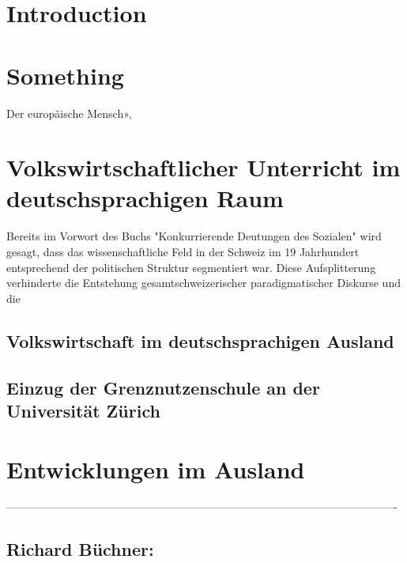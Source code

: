 \documentclass[12pt,a4paper,bibliography=totocnumbered,listof=totocnumbered]{scrartcl}
\begin{document}

\section{Introduction}
\newpage


\section{Something}
Der europäische Mensch», 


\section{Volkswirtschaftlicher Unterricht im deutschsprachigen Raum}

Bereits im Vorwort des Buchs "Konkurrierende Deutungen des Sozialen" wird gesagt, dass das wissenschaftliche Feld in der Schweiz im 19 Jahrhundert entsprechend der politischen Struktur segmentiert war. Diese Aufsplitterung verhinderte die Entstehung gesamtschweizerischer paradigmatischer Diskurse und  die 
 

\subsection{Volkswirtschaft im deutschsprachigen Ausland}
\subsection{Einzug der Grenznutzenschule an der Universität Zürich}
\section{Entwicklungen im Ausland}

%
 ----------------------------------------------------------------------------------------------------------

\subsection{Richard Büchner:}
\end{document}
